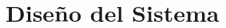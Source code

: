 \documentclass[xcolor=dvipsnames]{beamer}
\begin{document}
\begin{frame}
\begin{columns}
\begin{column}{0.4\textwidth}
\begin{center}
            \end{center}
        \end{column}
    \end{columns}
\end{frame}

\section{Diseño del Sistema}
\end{document}
